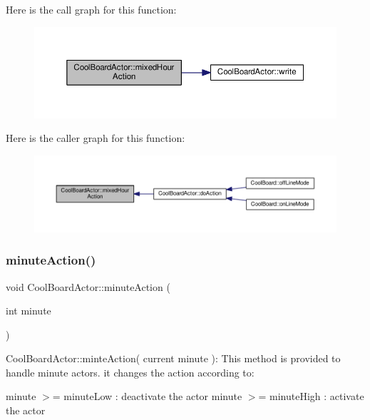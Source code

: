 Here is the call graph for this function\+:\nopagebreak
\begin{figure}[H]
\begin{center}
\leavevmode
\includegraphics[width=350pt]{dc/d69/class_cool_board_actor_a6d93a24502c56ced2ef7675c913a276b_cgraph}
\end{center}
\end{figure}
Here is the caller graph for this function\+:\nopagebreak
\begin{figure}[H]
\begin{center}
\leavevmode
\includegraphics[width=350pt]{dc/d69/class_cool_board_actor_a6d93a24502c56ced2ef7675c913a276b_icgraph}
\end{center}
\end{figure}
\mbox{\label{class_cool_board_actor_af000944ce0b9abb9c6ee4b8fe839fb36}} 
\subsubsection{\texorpdfstring{minute\+Action()}{minuteAction()}}
{\footnotesize\ttfamily void Cool\+Board\+Actor\+::minute\+Action (\begin{DoxyParamCaption}\item[{int}]{minute }\end{DoxyParamCaption})}

Cool\+Board\+Actor\+::minte\+Action( current minute )\+: This method is provided to handle minute actors. it changes the action according to\+:

minute $>$= minute\+Low \+: deactivate the actor minute $>$= minute\+High \+: activate the actor 

